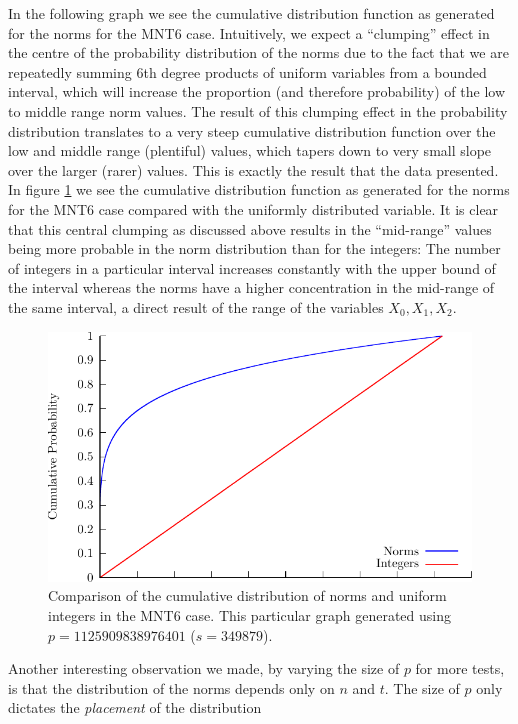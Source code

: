 \documentclass[a4paper, 12pt, envcountsect, runningheads]{llncs}
\numberwithin{figure}{section}
\numberwithin{equation}{section}
\begin{document}
In the following graph we see the cumulative distribution function as generated for the norms for the MNT6 case. Intuitively, we expect a ``clumping'' effect in the centre of the probability distribution of the norms due to the fact that we are repeatedly summing 6th degree products of uniform variables from a bounded interval, which will increase the proportion (and therefore probability) of the low to middle range norm values. The result of this clumping effect in the probability distribution translates to a very steep cumulative distribution function over the low and middle range (plentiful) values, which tapers down to very small slope over the larger (rarer) values. This is exactly the result that the data presented. In figure \ref{fig:comp} we see the cumulative distribution function as generated for the norms for the MNT6 case compared with the uniformly distributed variable.
It is clear that this central clumping as discussed above results in the ``mid-range'' values being more probable in the norm distribution than for the integers: The number of integers in a particular interval increases constantly with the upper bound of the interval whereas the norms have a higher concentration in the mid-range of the same interval, a direct result of the range of the variables $X_0,X_1,X_2$. 
\begin{figure}\label{fig:comp}
\includegraphics[scale=1]{graphs/cumulative}\caption{Comparison of the cumulative distribution of norms and uniform integers in the MNT6 case. This particular graph generated using $p=1125909838976401$ ($s=349879$).}
\end{figure}
Another interesting observation we made, by varying the size of $p$ for more tests, is that the distribution of the norms depends only on $n$ and $t$. The size of $p$ only dictates the \textit{placement} of the distribution %
\end{document}
